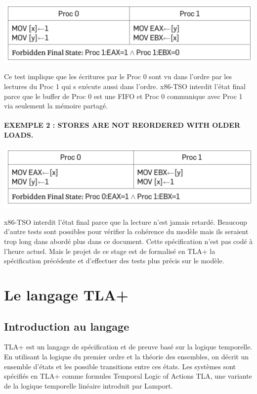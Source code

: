 \documentclass[12pt,a4paper]{article}
\begin{document}
	\begin{center}
		\includegraphics[scale=0.9]{exemple1.png}
	\end{center}

Ce test implique que les écritures par le Proc 0 sont vu dans l'ordre par les lectures du Proc 1 qui s exécute aussi dans l'ordre. x86-TSO interdit l'état final parce que le buffer de Proc 0 est une FIFO et Proc 0 communique avec Proc 1 via seulement la mémoire partagé.

\paragraph{EXEMPLE 2 : STORES ARE NOT REORDERED WITH OLDER LOADS.}
  
	\begin{center}
		\includegraphics[scale=0.9]{exemple2.png}
    \end{center}

x86-TSO interdit l'état final parce que la lecture n'est jamais retardé.
Beaucoup d'autre tests sont possibles pour vérifier la cohérence du modèle mais ils seraient trop long dans abordé plus dans ce document. Cette spécification n'est pas codé à l'heure actuel. Mais le projet de ce stage est de formalisé en TLA+ la spécification précédente et d'effectuer des tests plus précis sur le modèle.

\section{Le langage TLA+}

\subsection{Introduction au langage}

TLA+ est un langage de spécification et de preuve basé sur la logique temporelle. En utilisant la logique du premier ordre et la théorie des ensembles, on décrit un ensemble d'états et les possible transitions entre ces états. Les systèmes sont spécifiés en TLA+ comme formules Temporal Logic
of Actions TLA, une variante de la logique temporelle linéaire introduit par Lamport.
\end{document}
